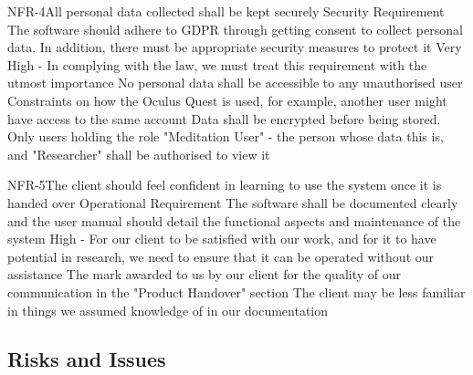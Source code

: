 \documentclass[coverpage,lineno]{../custom}
\begin{document}
\NonFunctionalReqSec
{NFR-4}{All personal data collected shall be kept securely}
{Security Requirement}
{The software should adhere to GDPR through getting consent to collect personal data. In addition, there must be appropriate security measures to protect it}
{Very High - In complying with the law, we must treat this requirement with the utmost importance}
{No personal data shall be accessible to any unauthorised user}
{Constraints on how the Oculus Quest is used, for example, another user might have access to the same account}
{Data shall be encrypted before being stored. Only users holding the role "Meditation User" - the person whose data this is, and "Researcher" shall be authorised to view it}


\NonFunctionalReq
{NFR-5}{The client should feel confident in learning to use the system once it is handed over}
{Operational Requirement}
{The software shall be documented clearly and the user manual should detail the functional aspects and maintenance of the system}
{High - For our client to be satisfied with our work, and for it to have potential in research, we need to ensure that it can be operated without our assistance}
{The mark awarded to us by our client for the quality of our communication in the "Product Handover" section}
{The client may be less familiar in things we assumed knowledge of in our documentation}

\subsection{Risks and Issues}
\label{ssec:risks}
\end{document}
